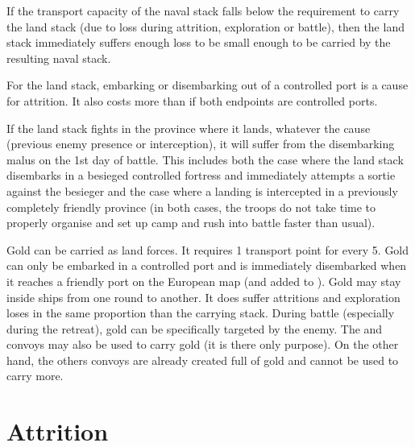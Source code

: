 If the transport capacity of the naval stack falls below the requirement to
carry the land stack (due to loss during attrition, exploration or battle),
then the land stack immediately suffers enough loss to be small enough to be
carried by the resulting naval stack.

For the land stack, embarking or disembarking out of a controlled port is a
cause for attrition. It also costs more \MP than if both endpoints are
controlled ports.

If the land stack fights in the province where it lands, whatever the cause
(previous enemy presence or interception), it will suffer from the
disembarking malus on the 1st day of battle. This includes both the case where
the land stack disembarks in a besieged controlled fortress and immediately
attempts a sortie against the besieger and the case where a landing is
intercepted in a previously completely friendly province (in both cases, the
troops do not take time to properly organise and set up camp and rush into
battle faster than usual).

Gold can be carried as land forces. It requires 1 transport point for every
5\ducats. Gold can only be embarked in a controlled port and is immediately
disembarked when it reaches a friendly port on the European map (and added to
). Gold may stay inside ships from
one round to another. It does suffer attritions and exploration loses in the
same proportion than the carrying stack. During battle (especially during the
retreat), gold can be specifically targeted by the enemy. The  and  convoys may also be used to carry gold (it
is there only purpose). On the other hand, the others convoys are already
created full of gold and cannot be used to carry more.



\section{Attrition}
\label{chMilitary:Attrition}
